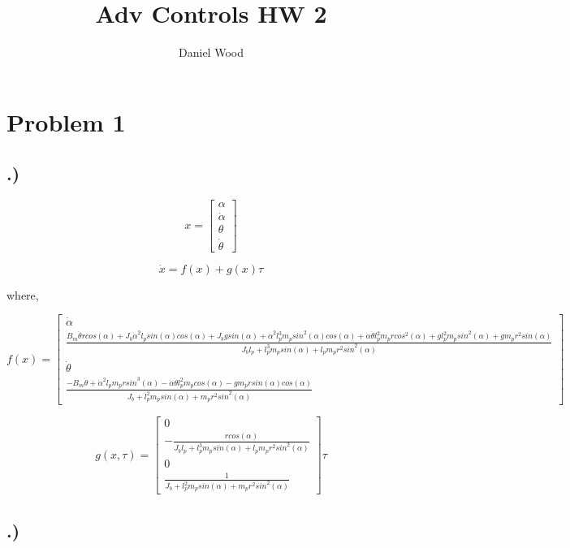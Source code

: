 \documentclass[10pt, letterpaper]{article}
\begin{document}
\title{Adv Controls HW 2}
\author{Daniel Wood}
\maketitle
\section{Problem 1}

\subsection{.)}

\[
x = \left[\begin{matrix}
\alpha\\
\dot{\alpha}\\
\theta\\
\dot{\theta}\end{matrix}\right]
\]

\[
\dot{x} = f(x) + g(x)\tau
\]

where,

\[
f(x) = \left[\begin{matrix}
\dot{\alpha}\\
\frac{B_{m} \dot{\theta} r {cos}(\alpha) + J_{b} \dot{\alpha}^{2} l_{p} {sin}(\alpha) {cos}(\alpha) + J_{b} g {sin}(\alpha) + \dot{\alpha}^{2} l_{p}^{3} m_{p} {sin}^{2}(\alpha) {cos}(\alpha) + \dot{\alpha} \dot{\theta} l_{p}^{2} m_{p} r {cos}^{2}(\alpha) + g l_{p}^{2} m_{p} {sin}^{2}(\alpha) + g m_{p} r^{2} {sin}(\alpha)}{J_{b} l_{p} + l_{p}^{3} m_{p} {sin}(\alpha) + l_{p} m_{p} r^{2} {sin}^{2}(\alpha)}\\
\dot{\theta}\\
\frac{- B_{m} \dot{\theta} + \dot{\alpha}^{2} l_{p} m_{p} r {sin}^{3}(\alpha) - \dot{\alpha} \dot{\theta} l_{p}^{2} m_{p} {cos}(\alpha) - g m_{p} r {sin}(\alpha) {cos}(\alpha)}{J_{b} + l_{p}^{2} m_{p} {sin}(\alpha) + m_{p} r^{2} {sin}^{2}(\alpha)}\end{matrix}\right]
\]

\[
g(x, \tau) = \left[\begin{matrix}
0\\
- \frac{r {cos}(\alpha)}{J_{b} l_{p} + l_{p}^{3} m_{p} {sin}(\alpha) + l_{p} m_{p} r^{2} {sin}^{2}(\alpha)}\\
0\\
\frac{1}{J_{b} + l_{p}^{2} m_{p} {sin}(\alpha) + m_{p} r^{2} {sin}^{2}(\alpha)}\end{matrix}\right]\tau
\]

\subsection{.)}
\end{document}
